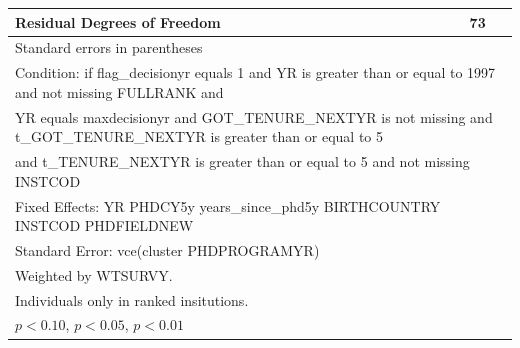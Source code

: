 \begin{table}[htbp]
\begin{tabular}{l*{1}{c}}
Residual Degrees of Freedom&          73         \\
\hline\hline
\multicolumn{2}{l}{\footnotesize Standard errors in parentheses}\\
\multicolumn{2}{l}{\footnotesize Condition: if flag\_decisionyr equals 1 and YR is greater than or equal to 1997 and not missing FULLRANK and}\\
\multicolumn{2}{l}{\footnotesize YR equals maxdecisionyr and GOT\_TENURE\_NEXTYR is not missing and t\_GOT\_TENURE\_NEXTYR is greater than or equal to 5}\\
\multicolumn{2}{l}{\footnotesize and t\_TENURE\_NEXTYR is greater than or equal to 5 and not missing INSTCOD}\\
\multicolumn{2}{l}{\footnotesize Fixed Effects: YR PHDCY5y years\_since\_phd5y BIRTHCOUNTRY INSTCOD PHDFIELDNEW}\\
\multicolumn{2}{l}{\footnotesize Standard Error: vce(cluster PHDPROGRAMYR)}\\
\multicolumn{2}{l}{\footnotesize Weighted by WTSURVY.}\\
\multicolumn{2}{l}{\footnotesize Individuals only in ranked insitutions.}\\
\multicolumn{2}{l}{\footnotesize \sym{*} \(p<0.10\), \sym{**} \(p<0.05\), \sym{***} \(p<0.01\)}\\
\end{tabular}
\end{table}
